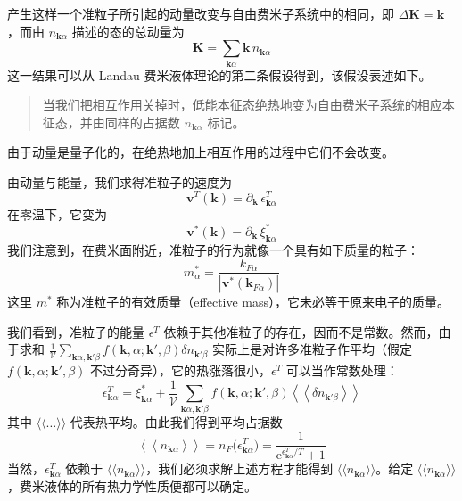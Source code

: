 产生这样一个准粒子所引起的动量改变与自由费米子系统中的相同，即 $\Delta\pmb{K} = \pmb{k}$，而由 $n_{\pmb{k}\alpha}$ 描述的态的总动量为
\begin{equation*}
\pmb{K} = \sum_{\pmb{k}\alpha} \pmb{k}\, n_{\pmb{k}\alpha}
\end{equation*}
这一结果可以从 Landau 费米液体理论的第二条假设得到，该假设表述如下。

\begin{quote}
当我们把相互作用关掉时，低能本征态绝热地变为自由费米子系统的相应本征态，并由同样的占据数 $n_{\pmb{k}\alpha}$ 标记。
\end{quote}

由于动量是量子化的，在绝热地加上相互作用的过程中它们不会改变。

由动量与能量，我们求得准粒子的速度为
\begin{equation*}
\pmb{v}^{T}(\pmb{k}) = \partial_{\pmb{k}}\, \epsilon^{T}_{\pmb{k}\alpha}
\end{equation*}
在零温下，它变为
\begin{equation*}
\pmb{v}^{*}(\pmb{k}) = \partial_{\pmb{k}}\, \xi^{*}_{\pmb{k}\alpha}
\end{equation*}
我们注意到，在费米面附近，准粒子的行为就像一个具有如下质量的粒子：
\begin{equation*}
m^{*}_{\alpha} = \frac{k_{F\alpha}}{|\pmb{v}^{*}(\pmb{k}_{F\alpha})|}
\end{equation*}
这里 $m^{*}$ 称为准粒子的有效质量（effective mass），它未必等于原来电子的质量。

我们看到，准粒子的能量 $\epsilon^{T}$ 依赖于其他准粒子的存在，因而不是常数。然而，由于求和 $\frac{1}{\mathcal{V}}\sum_{\pmb{k}\alpha,\pmb{k}'\beta} f(\pmb{k},\alpha;\pmb{k}',\beta)\delta n_{\pmb{k}'\beta}$ 实际上是对许多准粒子作平均（假定 $f(\pmb{k},\alpha;\pmb{k}',\beta)$ 不过分奇异），它的热涨落很小，$\epsilon^{T}$ 可以当作常数处理：
\begin{equation*}
\epsilon^{T}_{\pmb{k}\alpha} = \xi^{*}_{\pmb{k}\alpha} + \frac{1}{\mathcal{V}} \sum_{\pmb{k}\alpha,\pmb{k}'\beta} f(\pmb{k},\alpha;\pmb{k}',\beta) \left\langle\!\left\langle \delta n_{\pmb{k}'\beta} \right\rangle\!\right\rangle
\end{equation*}
其中 $\langle\!\langle\ldots\rangle\!\rangle$ 代表热平均。由此我们得到平均占据数
\begin{equation*}
\left\langle\!\left\langle n_{\pmb{k}\alpha} \right\rangle\!\right\rangle = n_F\big( \epsilon^{T}_{\pmb{k}\alpha} \big) = \frac{1}{\mathrm{e}^{\epsilon^{T}_{\pmb{k}\alpha}/T} + 1}
\end{equation*}
当然，$\epsilon^{T}_{\pmb{k}\alpha}$ 依赖于 $\langle\!\langle n_{\pmb{k}\alpha} \rangle\!\rangle$，我们必须求解上述方程才能得到 $\langle\!\langle n_{\pmb{k}\alpha} \rangle\!\rangle$。给定 $\langle\!\langle n_{\pmb{k}\alpha} \rangle\!\rangle$，费米液体的所有热力学性质便都可以确定。

